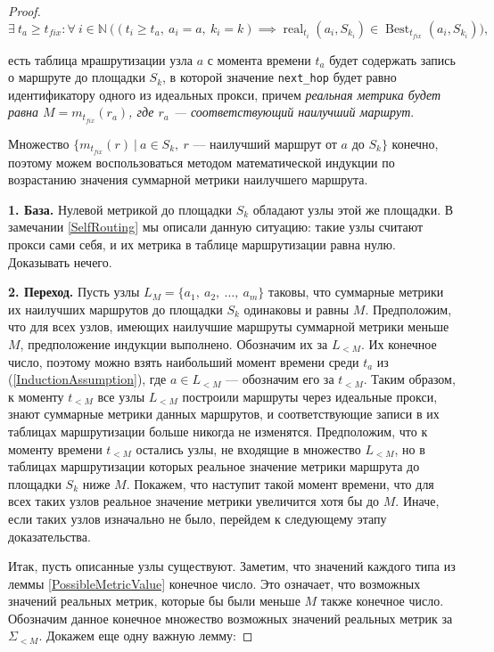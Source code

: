 \documentclass{article}
\theoremstyle{plain}
\theoremstyle{plain}
\theoremstyle{plain}
\theoremstyle{plain}
\theoremstyle{definition}
\theoremstyle{remark}
\theoremstyle{plain}
\DeclareMathOperator*{\real}{real}
\DeclareMathOperator*{\best}{Best}
\begin{document}
\begin{proof}
    \begin{equation}
    \label{InductionAssumption}
        \exists\ t_a \geq t_{fix} \colon \forall\ i \in \mathbb{N}\ \Big( (t_i \geq t_a,\ a_i = a,\ k_i = k) \implies {\real}_{t_i}(a_i, S_{k_i}) \in {\best}_{t_{fix}}(a_i, S_{k_i}) \Big),
    \end{equation}
    
     есть таблица мрашрутизации узла $a$ с момента времени $t_a$ будет содержать запись о маршруте до площадки $S_k$, в которой значение \texttt{next\_hop} будет равно идентификатору одного из идеальных прокси, причем \textit{реальная метрика будет равна $M = m_{t_{fix}}(r_a)$, где $r_a$ --- соответствующий наилучший маршрут}.
    
    Множество $\{ m_{t_{fix}}(r)\ |\ a \in S_k,\ r \text{ --- наилучший маршрут от } a \text{ до } S_k \}$ конечно, поэтому можем воспользоваться методом математической индукции по возрастанию значения суммарной метрики наилучшего маршрута.
    
    \textbf{1. База.} Нулевой метрикой до площадки $S_k$ обладают узлы этой же площадки. В замечании \ref{SelfRouting} мы описали данную ситуацию: такие узлы считают прокси сами себя, и их метрика в таблице маршрутизации равна нулю. Доказывать нечего.
    
    \textbf{2. Переход.} Пусть узлы $L_M = \{ a_1,\ a_2,\ \ldots,\ a_m \}$ таковы, что суммарные метрики их наилучших маршрутов до площадки $S_k$ одинаковы и равны $M$. Предположим, что для всех узлов, имеющих наилучшие маршруты суммарной метрики меньше $M$, предположение индукции выполнено. Обозначим их за $L_{< M}$. Их конечное число, поэтому можно взять наибольший момент времени среди $t_a$ из (\ref{InductionAssumption}), где $a \in L_{< M}$ --- обозначим его за $t_{< M}$. Таким образом, к моменту $t_{< M}$ все узлы $L_{< M}$ построили маршруты через идеальные прокси, знают суммарные метрики данных маршрутов, и соответствующие записи в их таблицах маршрутизации больше никогда не изменятся. Предположим, что к моменту времени $t_{< M}$ остались узлы, не входящие в множество $L_{< M}$, но в таблицах маршрутизации которых реальное значение метрики маршрута до площадки $S_k$ ниже $M$. Покажем, что наступит такой момент времени, что для всех таких узлов реальное значение метрики увеличится хотя бы до $M$. Иначе, если таких узлов изначально не было, перейдем к следующему этапу доказательства.
    
    Итак, пусть описанные узлы существуют. Заметим, что значений каждого типа из леммы \ref{PossibleMetricValue} конечное число. Это означает, что возможных значений реальных метрик, которые бы были меньше $M$ также конечное число. Обозначим данное конечное множество возможных значений реальных метрик за $\Sigma_{< M}$. Докажем еще одну важную лемму:
    

\end{proof}
\end{document}
